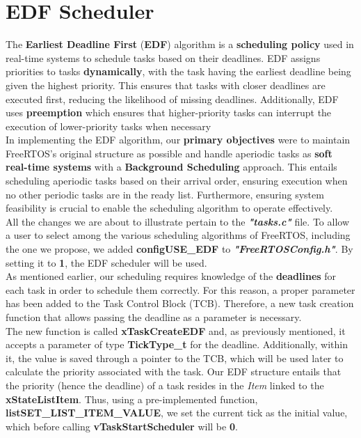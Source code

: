 \documentclass{article}
\begin{document}
\section{EDF Scheduler}
The \textbf{Earliest Deadline First} (\textbf{EDF}) algorithm is a \textbf{scheduling policy} used in real-time systems to schedule tasks based on their deadlines. EDF assigns priorities to tasks \textbf{dynamically}, with the task having the earliest deadline being given the highest priority. This ensures that tasks with closer deadlines are executed first, reducing the likelihood of missing deadlines. Additionally, EDF uses \textbf{preemption} which ensures that higher-priority tasks can interrupt the execution of lower-priority tasks when necessary\\[0.1cm]
In implementing the EDF algorithm, our \textbf{primary objectives} were to maintain FreeRTOS's original structure as possible and handle aperiodic tasks as \textbf{soft real-time systems} with a \textbf{Background Scheduling} approach. This entails scheduling aperiodic tasks based on their arrival order, ensuring execution when no other periodic tasks are in the ready list. Furthermore, ensuring system feasibility is crucial to enable the scheduling algorithm to operate effectively.\\[0.1cm]
All the changes we are about to illustrate pertain to the \textit{\textbf{"tasks.c"}} file. To allow a user to select among the various scheduling algorithms of FreeRTOS, including the one we propose, we added \textbf{configUSE\_EDF} to \textit{\textbf{"FreeRTOSConfig.h"}}. By setting it to \textbf{1}, the EDF scheduler will be used.\\[0.1cm]
As mentioned earlier, our scheduling requires knowledge of the \textbf{deadlines} for each task in order to schedule them correctly. For this reason, a proper parameter has been added to the Task Control Block (TCB). Therefore, a new task creation function that allows passing the deadline as a parameter is necessary.\\[0.1cm]
The new function is called \textbf{xTaskCreateEDF} and, as previously mentioned, it accepts a parameter of type \textbf{TickType\_t} for the deadline. Additionally, within it, the value is saved through a pointer to the TCB, which will be used later to calculate the priority associated with the task. Our EDF  structure entails that the priority (hence the deadline) of a task resides in the \textit{Item} linked to the \textbf{xStateListItem}. Thus, using a pre-implemented function, \textbf{listSET\_LIST\_ITEM\_VALUE}, we set the current tick as the initial value, which before calling \textbf{vTaskStartScheduler} will be \textbf{0}.
\end{document}

